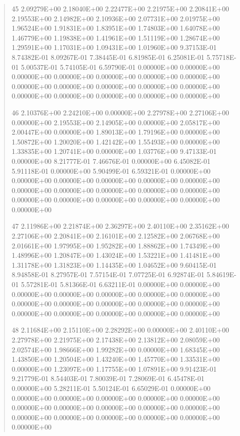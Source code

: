 \documentclass[letterpaper,10pt,english]{sphinxmanual}
\begin{document}
\begin{quote}
\begin{DUlineblock}{0em}
\item[] 45   2.09279E+00  2.18040E+00  2.22477E+00  2.21975E+00  2.20841E+00  2.19553E+00  2.14982E+00  2.10936E+00  2.07731E+00  2.01975E+00  1.96524E+00  1.91831E+00  1.83951E+00  1.74803E+00  1.64078E+00  1.46779E+00  1.19838E+00  1.41961E+00  1.51119E+00  1.28674E+00  1.29591E+00  1.17031E+00  1.09431E+00  1.01960E+00  9.37153E-01  8.74382E-01  8.09267E-01  7.38445E-01  6.81985E-01  6.25081E-01  5.75718E-01  5.00537E-01  5.74105E-01  6.59790E-01  0.00000E+00  0.00000E+00  0.00000E+00  0.00000E+00  0.00000E+00  0.00000E+00  0.00000E+00  0.00000E+00  0.00000E+00  0.00000E+00  0.00000E+00  0.00000E+00  0.00000E+00  0.00000E+00  0.00000E+00  0.00000E+00  0.00000E+00
\item[] 46   2.10376E+00  2.24210E+00  0.00000E+00  2.27978E+00  2.27106E+00  0.00000E+00  2.19553E+00  2.14905E+00  0.00000E+00  2.05817E+00  2.00447E+00  0.00000E+00  1.89013E+00  1.79196E+00  0.00000E+00  1.50872E+00  1.20020E+00  1.42142E+00  1.55493E+00  0.00000E+00  1.33835E+00  1.20741E+00  0.00000E+00  1.03776E+00  9.47133E-01  0.00000E+00  8.21777E-01  7.46676E-01  0.00000E+00  6.45082E-01  5.91118E-01  0.00000E+00  5.90499E-01  6.59321E-01  0.00000E+00  0.00000E+00  0.00000E+00  0.00000E+00  0.00000E+00  0.00000E+00  0.00000E+00  0.00000E+00  0.00000E+00  0.00000E+00  0.00000E+00  0.00000E+00  0.00000E+00  0.00000E+00  0.00000E+00  0.00000E+00  0.00000E+00
\item[] 47   2.11986E+00  2.21874E+00  2.36297E+00  2.40110E+00  2.35162E+00  2.27106E+00  2.20841E+00  2.16101E+00  2.12582E+00  2.06768E+00  2.01661E+00  1.97995E+00  1.95282E+00  1.88862E+00  1.74349E+00  1.48996E+00  1.20847E+00  1.43024E+00  1.53221E+00  1.41481E+00  1.31178E+00  1.31823E+00  1.14435E+00  1.04652E+00  9.60415E-01  8.94858E-01  8.27957E-01  7.57154E-01  7.07725E-01  6.92874E-01  5.84619E-01  5.57281E-01  5.81366E-01  6.63211E-01  0.00000E+00  0.00000E+00  0.00000E+00  0.00000E+00  0.00000E+00  0.00000E+00  0.00000E+00  0.00000E+00  0.00000E+00  0.00000E+00  0.00000E+00  0.00000E+00  0.00000E+00  0.00000E+00  0.00000E+00  0.00000E+00  0.00000E+00
\item[] 48   2.11684E+00  2.15110E+00  2.28292E+00  0.00000E+00  2.40110E+00  2.27978E+00  2.21975E+00  2.17438E+00  2.13812E+00  2.08059E+00  2.02574E+00  1.98666E+00  1.99282E+00  0.00000E+00  1.68345E+00  1.43850E+00  1.20504E+00  1.43240E+00  1.45770E+00  1.33531E+00  0.00000E+00  1.23097E+00  1.17755E+00  1.07891E+00  9.91423E-01  9.21779E-01  8.54403E-01  7.80039E-01  7.28069E-01  6.45478E-01  0.00000E+00  5.28211E-01  5.50124E-01  6.65029E-01  0.00000E+00  0.00000E+00  0.00000E+00  0.00000E+00  0.00000E+00  0.00000E+00  0.00000E+00  0.00000E+00  0.00000E+00  0.00000E+00  0.00000E+00  0.00000E+00  0.00000E+00  0.00000E+00  0.00000E+00  0.00000E+00  0.00000E+00

\end{DUlineblock}
\end{quote}
\end{document}
